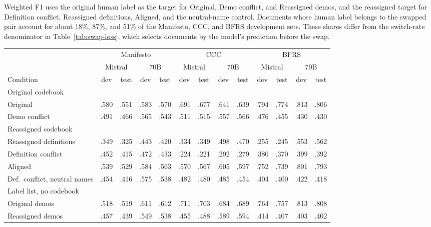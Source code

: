 \documentclass[11pt]{article}
\begin{document}
Weighted F1 uses the original human label as the target for Original, Demo conflict, and Reassigned demos, and the reassigned target for Definition conflict, Reassigned definitions, Aligned, and the neutral-name control. Documents whose human label belongs to the swapped pair account for about 18\%, 87\%, and 51\% of the Manifesto, CCC, and BFRS development sets. These shares differ from the switch-rate denominator in Table~\ref{tab:swap-loss}, which selects documents by the model's prediction before the swap.

\begin{table}[!t]
\centering
\setlength{\tabcolsep}{3.5pt}
\begin{tabular}{lcccccccccccc}
\toprule
 & \multicolumn{4}{c}{Manifesto} & \multicolumn{4}{c}{CCC} & \multicolumn{4}{c}{BFRS} \\
\cmidrule(lr){2-5}\cmidrule(lr){6-9}\cmidrule(lr){10-13}
 & \multicolumn{2}{c}{Mistral} & \multicolumn{2}{c}{70B} & \multicolumn{2}{c}{Mistral} & \multicolumn{2}{c}{70B} & \multicolumn{2}{c}{Mistral} & \multicolumn{2}{c}{70B} \\
Condition & dev & test & dev & test & dev & test & dev & test & dev & test & dev & test \\
\midrule
\multicolumn{13}{l}{Original codebook} \\
Original & .580 & .551 & .583 & .570 & .691 & .677 & .641 & .639 & .794 & .774 & .813 & .806 \\
Demo conflict & .491 & .466 & .565 & .543 & .511 & .515 & .557 & .566 & .476 & .455 & .430 & .430 \\
\midrule
\multicolumn{13}{l}{Reassigned codebook} \\
Reassigned definitions & .349 & .325 & .443 & .420 & .334 & .349 & .498 & .470 & .255 & .245 & .553 & .562 \\
Definition conflict & .452 & .415 & .472 & .433 & .224 & .221 & .292 & .279 & .380 & .370 & .399 & .392 \\
Aligned & .539 & .529 & .584 & .563 & .570 & .567 & .605 & .597 & .752 & .739 & .801 & .793 \\
Def.\ conflict, neutral names & .454 & .416 & .575 & .538 & .482 & .480 & .485 & .454 & .404 & .400 & .422 & .418 \\
\midrule
\multicolumn{13}{l}{Label list, no codebook} \\
Original demos & .518 & .519 & .611 & .612 & .711 & .703 & .684 & .689 & .764 & .757 & .813 & .808 \\
Reassigned demos & .457 & .439 & .549 & .538 & .455 & .488 & .589 & .594 & .414 & .407 & .403 & .402 \\

\end{tabular}
\end{table}
\end{document}
